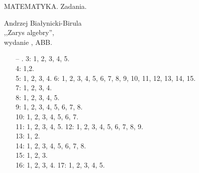 \documentclass[a4paper,11pt]{article}
\newcommand{\cm}{\checkmark}
\begin{document}
\begin{center}
MATEMATYKA. Zadania.
\end{center}



\begin{center}
Andrzej Białynicki-Birula\\
,,Zarys algebry'',\\wydanie {}, ABB.
\end{center}
\begin{itemize}
\item[--] . 
3: 1, 2, 3, 4, 5.\\
4: 1\cm ,2\cm . \\
5: 1, 2, 3, 4. 6: 1, 2, 3, 4, 5, 6, 7, 8, 9, 10, 11, 12, 13, 14, 15.\\
7: 1, 2, 3, 4.\\
8: 1, 2, 3, 4, 5.\\
9: 1, 2, 3, 4, 5, 6, 7, 8.\\
10: 1, 2, 3, 4, 5, 6, 7.\\
11: 1, 2, 3, 4, 5. 
12: 1, 2, 3, 4, 5, 6, 7, 8, 9.\\ 
13: 1, 2.\\
14: 1, 2, 3, 4, 5, 6, 7, 8.\\
15: 1, 2, 3.\\
16: 1, 2, 3, 4. 17: 1, 2, 3, 4, 5.

\end{itemize}
\end{document}
